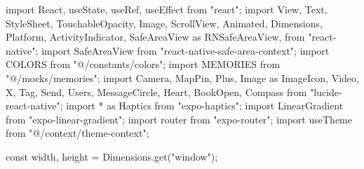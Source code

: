 import React, { useState, useRef, useEffect } from "react";
import {
  View,
  Text,
  StyleSheet,
  TouchableOpacity,
  Image,
  ScrollView,
  Animated,
  Dimensions,
  Platform,
  ActivityIndicator,
  SafeAreaView as RNSafeAreaView,
} from "react-native";
import { SafeAreaView } from "react-native-safe-area-context";
import { COLORS } from "@/constants/colors";
import { MEMORIES } from "@/mocks/memories";
import { 
  Camera, 
  MapPin, 
  Plus, 
  Image as ImageIcon, 
  Video, 
  X, 
  Tag, 
  Send,
  Users,
  MessageCircle,
  Heart,
  BookOpen,
  Compass
} from "lucide-react-native";
import * as Haptics from "expo-haptics";
import { LinearGradient } from "expo-linear-gradient";
import { router } from "expo-router";
import { useTheme } from "@/context/theme-context";

const { width, height } = Dimensions.get("window");

